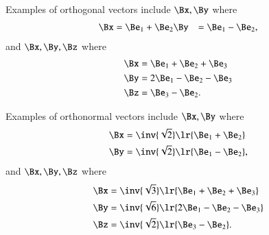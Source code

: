 %
%

Examples of orthogonal vectors
include \( \Bx, \By \) where
\begin{dmath}\label{eqn:prereq_standardbasis:300}
\begin{aligned}
\Bx &= \Be_1 + \Be_2
\By &= \Be_1 - \Be_2,
\end{aligned}
\end{dmath}
and \( \Bx, \By, \Bz \) where
\begin{dmath}\label{eqn:prereq_standardbasis:320}
\begin{aligned}
\Bx &= \Be_1 + \Be_2 + \Be_3 \\
\By &= 2 \Be_1 - \Be_2 - \Be_3 \\
\Bz &= \Be_3 - \Be_2.
\end{aligned}
\end{dmath}


Examples of orthonormal vectors
include \( \Bx, \By \) where
\begin{dmath}\label{eqn:prereq_standardbasis:340}
\begin{aligned}
\Bx &= \inv{\sqrt{2}}\lr{\Be_1 + \Be_2} \\
\By &= \inv{\sqrt{2}}\lr{\Be_1 - \Be_2},
\end{aligned}
\end{dmath}
and \( \Bx, \By, \Bz \) where
\begin{dmath}\label{eqn:prereq_standardbasis:360}
\begin{aligned}
\Bx &= \inv{\sqrt{3}}\lr{\Be_1 + \Be_2 + \Be_3} \\
\By &= \inv{\sqrt{6}}\lr{2 \Be_1 - \Be_2 - \Be_3} \\
\Bz &= \inv{\sqrt{2}}\lr{\Be_3 - \Be_2}.
\end{aligned}
\end{dmath}

